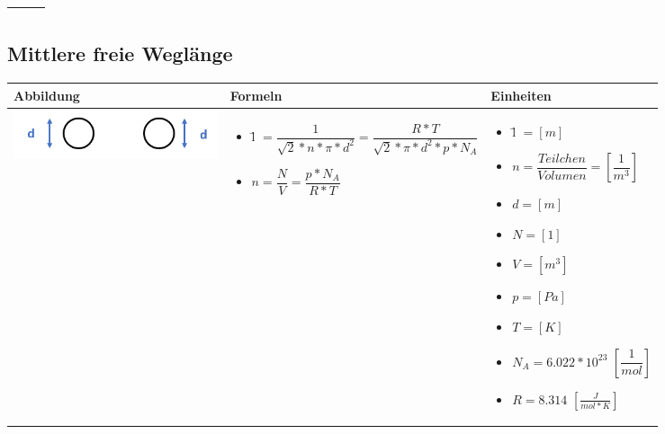 \begin{table}[h!]
\begin{tabular}{ | m{6cm} | m{6cm} | m{6cm} | }
\begin{itemize}
		\end{itemize}
		\\ \hline
	\end{tabular}
\end{table}

\subsection{Mittlere freie Weglänge}				%
\begin{table}[h!]
	\begin{tabular}{ | m{6cm} | m{7.5cm} | m{4.5cm} | }
		\hline
		Abbildung & Formeln & Einheiten \\ \hline
		\midrule
		\begin{minipage}{.3\textwidth}
			\includegraphics[width=6.0cm]{Figures/Weglaenge}
		\end{minipage}
		&
		\begin{itemize}
			\item\={l} $ =\dfrac{1}{\sqrt{2}*n*\pi*d^{2}}=\dfrac{R*T}{\sqrt{2}*\pi*d^2*p*N_A}$ 
			\item $n=\dfrac{N}{V}=\dfrac{p*N_A}{R*T}$
			
		\end{itemize}
		& 
		\begin{itemize}
			\item\={l} $ =[m]$ 
			\item$n=\dfrac{Teilchen}{Volumen}=[\dfrac{1}{m^{3}}]$
			\item$d=[m]$
			\item $N=[1]$
			\item $V=[m^3]$
			\item $p=[Pa]$
			\item $T=[K]$
			\item $N_{A}=6.022*10^{23}$ $[\dfrac{1}{mol}]$
			\item $R=8.314$ $[ \frac{J}{mol*K} ]$
			
		\end{itemize}
		\\ \hline
	\end{tabular}
\end{table}

